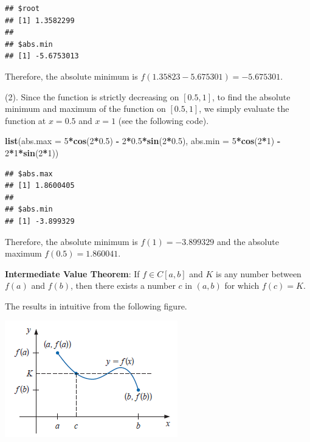 \documentclass[
]{book}
\newenvironment{Shaded}{\begin{snugshade}}{\end{snugshade}}
\newcommand{\AttributeTok}[1]{\textcolor[rgb]{0.13,0.29,0.53}{#1}}
\newcommand{\DecValTok}[1]{\textcolor[rgb]{0.00,0.00,0.81}{#1}}
\newcommand{\FloatTok}[1]{\textcolor[rgb]{0.00,0.00,0.81}{#1}}
\newcommand{\FunctionTok}[1]{\textcolor[rgb]{0.13,0.29,0.53}{\textbf{#1}}}
\newcommand{\NormalTok}[1]{#1}
\newcommand{\SpecialCharTok}[1]{\textcolor[rgb]{0.81,0.36,0.00}{\textbf{#1}}}
\begin{document}
\begin{verbatim}
## $root
## [1] 1.3582299
## 
## $abs.min
## [1] -5.6753013
\end{verbatim}

Therefore, the absolute minimum is \(f(1.35823-5.675301) = -5.675301\).

(2). Since the function is strictly decreasing on \([0.5, 1]\), to find the absolute minimum and maximum of the function on \([0.5, 1]\), we simply evaluate the function at \(x = 0.5\) and \(x = 1\) (see the following code).

\begin{Shaded}
\begin{Highlighting}[]
\FunctionTok{list}\NormalTok{(}\AttributeTok{abs.max =} \DecValTok{5}\SpecialCharTok{*}\FunctionTok{cos}\NormalTok{(}\DecValTok{2}\SpecialCharTok{*}\FloatTok{0.5}\NormalTok{) }\SpecialCharTok{{-}} \DecValTok{2}\SpecialCharTok{*}\FloatTok{0.5}\SpecialCharTok{*}\FunctionTok{sin}\NormalTok{(}\DecValTok{2}\SpecialCharTok{*}\FloatTok{0.5}\NormalTok{),}
     \AttributeTok{abs.min =} \DecValTok{5}\SpecialCharTok{*}\FunctionTok{cos}\NormalTok{(}\DecValTok{2}\SpecialCharTok{*}\DecValTok{1}\NormalTok{) }\SpecialCharTok{{-}} \DecValTok{2}\SpecialCharTok{*}\DecValTok{1}\SpecialCharTok{*}\FunctionTok{sin}\NormalTok{(}\DecValTok{2}\SpecialCharTok{*}\DecValTok{1}\NormalTok{))}
\end{Highlighting}
\end{Shaded}

\begin{verbatim}
## $abs.max
## [1] 1.8600405
## 
## $abs.min
## [1] -3.899329
\end{verbatim}

Therefore, the absolute minimum is \(f(1) = -3.899329\) and the absolute maximum \(f(0.5) = 1.860041\).

\textbf{Intermediate Value Theorem}: If \(f \in C[a, b]\) and \(K\) is any number between \(f (a)\) and \(f (b)\), then there exists a number \(c\) in \((a, b)\) for which \(f (c) = K\).

The results in intuitive from the following figure.

\begin{center}\includegraphics[width=0.75\linewidth]{img01/w01-IntermediateValThm} \end{center}
\end{document}

